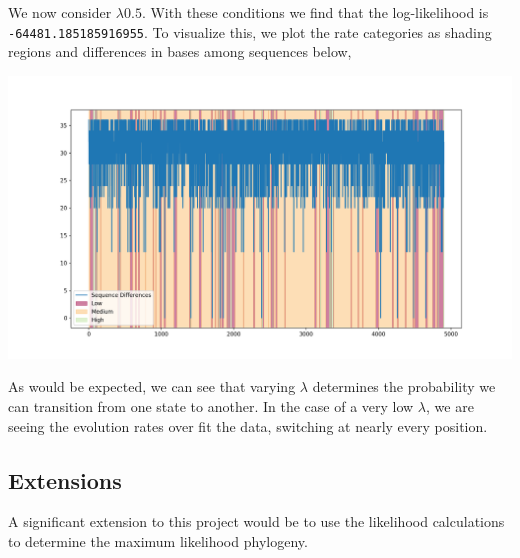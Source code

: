 \documentclass[12pt]{article}
\begin{document}
    We now consider $\lambda 0.5$.
    With these conditions we find that the log-likelihood is \texttt{-64481.185185916955}.
    To visualize this, we plot the rate categories as shading regions and differences in bases among sequences below,
    \begin{center}
        \includegraphics[scale=0.5]{../figs/high_med_low_medium_lambda.png}
    \end{center}

    As would be expected, we can see that varying $\lambda$ determines the probability we can transition from one state to another.
    In the case of a very low $\lambda$, we are seeing the evolution rates over fit the data, switching at nearly every position.

\subsection*{Extensions}
    A significant extension to this project would be to use the likelihood calculations to determine the maximum likelihood phylogeny.
\end{document}
